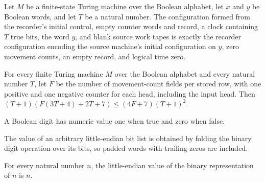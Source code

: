 \begin{lemma}
\label{Complexity.clRec_prepared}
\leanok
{}
Let $M$ be a finite-state Turing machine over the Boolean alphabet, let $x$ and $y$ be
Boolean words, and let $T$ be a natural number. The configuration formed from the
recorder's initial control, empty counter words and record, a clock containing $T$ true
bits, the word $y$, and blank source work tapes is exactly the recorder configuration
encoding the source machine's initial configuration on $y$, zero movement counts, an
empty record, and logical time zero.
\end{lemma}

\begin{lemma}
\label{Complexity.clRec_cost_bound}
\leanok
{}
For every finite Turing machine $M$ over the Boolean alphabet and every natural number
$T$, let $F$ be the number of movement-count fields per stored row, with one positive
and one negative counter for each head, including the input head. Then
$(T+1)(F(3T+4)+2T+7) \le (4F+7)(T+1)^2$.
\end{lemma}

\begin{definition}
\label{Complexity.clBit}
\leanok
A Boolean digit has numeric value one when true and zero when false.
\end{definition}

\begin{definition}
\label{Complexity.clNum}
\leanok
The value of an arbitrary little-endian bit list is obtained by folding the binary digit operation over its bits, so padded words with trailing zeros are included.
\end{definition}

\begin{lemma}
\label{Complexity.clNum_bits}
\leanok
{}
For every natural number $n$, the little-endian value of the binary representation of
$n$ is $n$.
\end{lemma}

